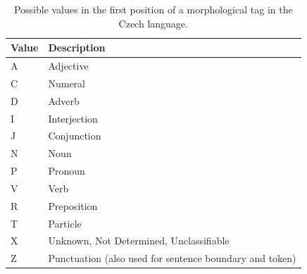 \begin{table}[t]
\small
\centering
\begin{tabular}{| l | l |} 
\hline
    Value & Description \\
\hline
    A & Adjective \\
    C & Numeral \\
    D & Adverb \\
    I & Interjection \\
    J & Conjunction \\
    N & Noun \\
    P & Pronoun \\
    V & Verb \\
    R & Preposition \\
    T & Particle \\
    X & Unknown, Not  Determined, Unclassifiable \\
    Z & Punctuation (also used for sentence boundary and token) \\
\hline
\end{tabular}
\caption{Possible values in the first position of a morphological tag in the Czech language.}
\label{tab:czech-pos1}
\end{table}
